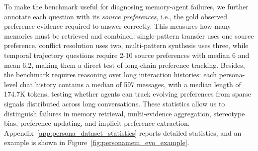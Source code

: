 \documentclass{llmxive}
\begin{document}
To make the benchmark useful for diagnosing memory-agent failures, we further annotate each question with its \emph{source preferences}, i.e., the gold observed preference evidence required to answer correctly. 
This measures how many memories must be retrieved and combined: single-pattern transfer uses one source preference, conflict resolution uses two, multi-pattern synthesis uses three, while temporal trajectory questions require 2-10 source preferences with median 6 and mean 6.2, making them a direct test of long-chain preference tracking. 
Besides, the benchmark requires reasoning over long interaction histories: each persona-level chat history contains a median of 597 messages, with a median length of 174.7K tokens, testing whether agents can track evolving preferences from sparse signals distributed across long conversations.
These statistics allow us to distinguish failures in memory retrieval, multi-evidence aggregation, stereotype bias, preference updating, and implicit preference extraction. Appendix~\ref{app:persona_dataset_statistics} reports detailed statistics, and an example is shown in Figure~\ref{fig:personamem_evo_example}.
\end{document}
